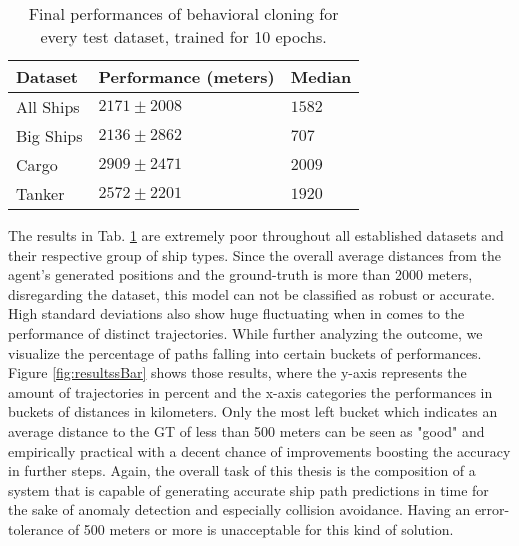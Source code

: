 \begin{table}[H]
\centering
\begin{tabular}{|l|l|l|}
\hline
\textbf{Dataset} & \textbf{Performance (meters)}  & \textbf{Median} \\ \hline
All Ships        & $2171 \pm 2008$                & $1582$          \\ \hline
Big Ships        & $2136 \pm 2862$                & $707$           \\ \hline
Cargo            & $2909 \pm 2471$                & $2009$          \\ \hline
Tanker           & $2572 \pm 2201$ & $1920$          \\ \hline
\end{tabular}
\label{tab:rlResults}
\caption{Final performances of behavioral cloning for every test dataset, trained for 10 epochs.}
\end{table}
The results in Tab. \ref{tab:rlResults} are extremely poor throughout all established datasets and their respective group of ship types. Since the overall average distances from the agent's generated positions and the ground-truth is more than 2000 meters, disregarding the dataset, this model can not be classified as robust or accurate. High standard deviations also show huge fluctuating when in comes to the performance of distinct trajectories. While further analyzing the outcome, we visualize the percentage of paths falling into certain buckets of performances. Figure \ref{fig:resultssBar} shows those results, where the y-axis represents the amount of trajectories in percent and the x-axis categories the performances in buckets of distances in kilometers. Only the most left bucket which indicates an average distance to the GT of less than 500 meters can be seen as "good" and empirically practical with a decent chance of improvements boosting the accuracy in further steps. Again, the overall task of this thesis is the composition of a system that is capable of generating accurate ship path predictions in time for the sake of anomaly detection and especially collision avoidance. Having an error-tolerance of 500 meters or more is unacceptable for this kind of solution.
